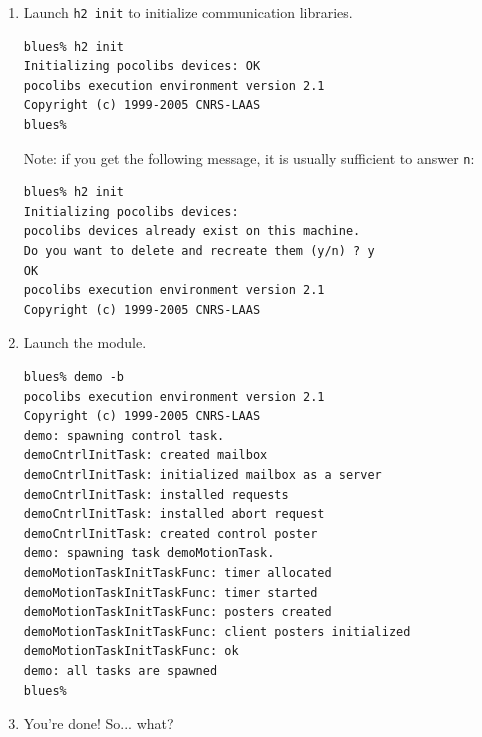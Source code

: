 \begin{enumerate}
\item Launch \texttt{h2 init} to initialize communication libraries.

\begin{center}\begin{cartouche}\small\begin{verbatim}
blues% h2 init
Initializing pocolibs devices: OK
pocolibs execution environment version 2.1
Copyright (c) 1999-2005 CNRS-LAAS
blues%
\end{verbatim}\end{cartouche}\end{center}

Note: if you get the following message, it is usually sufficient to
answer \texttt{n}:

\begin{center}\begin{cartouche}\small\begin{verbatim}
blues% h2 init
Initializing pocolibs devices: 
pocolibs devices already exist on this machine.
Do you want to delete and recreate them (y/n) ? y
OK
pocolibs execution environment version 2.1
Copyright (c) 1999-2005 CNRS-LAAS
\end{verbatim}\end{cartouche}\end{center}

\item Launch the module.

\begin{center}\begin{cartouche}\small\begin{verbatim}
blues% demo -b
pocolibs execution environment version 2.1
Copyright (c) 1999-2005 CNRS-LAAS
demo: spawning control task.
demoCntrlInitTask: created mailbox
demoCntrlInitTask: initialized mailbox as a server
demoCntrlInitTask: installed requests
demoCntrlInitTask: installed abort request
demoCntrlInitTask: created control poster
demo: spawning task demoMotionTask.
demoMotionTaskInitTaskFunc: timer allocated
demoMotionTaskInitTaskFunc: timer started
demoMotionTaskInitTaskFunc: posters created
demoMotionTaskInitTaskFunc: client posters initialized
demoMotionTaskInitTaskFunc: ok
demo: all tasks are spawned
blues% 
\end{verbatim}\end{cartouche}\end{center}

\item You're done! So... what?
\end{enumerate}

